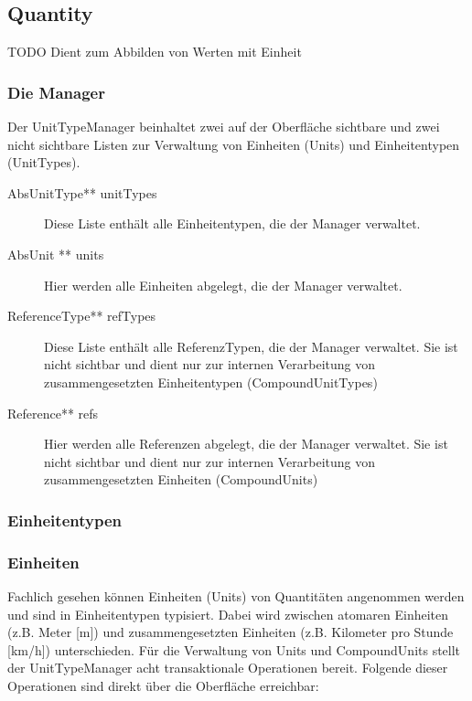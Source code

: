 \subsection{Quantity}
TODO Dient zum Abbilden von Werten mit Einheit

\subsubsection{Die Manager} \newline
{} \newline
Der UnitTypeManager beinhaltet zwei auf der Oberfläche sichtbare und zwei nicht sichtbare Listen zur Verwaltung von Einheiten (Units) und Einheitentypen (UnitTypes).

\begin{description}
\item[AbsUnitType** unitTypes] Diese Liste enthält alle Einheitentypen, die der Manager verwaltet.
\item[AbsUnit ** units] Hier werden alle Einheiten abgelegt, die der Manager verwaltet.
\item[ReferenceType** refTypes] Diese Liste enthält alle ReferenzTypen, die der Manager verwaltet. Sie ist nicht sichtbar und dient nur zur internen Verarbeitung von zusammengesetzten Einheitentypen (CompoundUnitTypes)
\item[Reference** refs] Hier werden alle Referenzen abgelegt, die der Manager verwaltet. Sie ist nicht sichtbar und dient nur zur internen Verarbeitung von zusammengesetzten Einheiten (CompoundUnits)
\end{description}

 \newline

\subsubsection{Einheitentypen} \newline

\subsubsection{Einheiten} \newline
Fachlich gesehen können Einheiten (Units) von Quantitäten angenommen werden und sind in Einheitentypen typisiert.
Dabei wird zwischen atomaren Einheiten (z.B. Meter [m]) und zusammengesetzten Einheiten (z.B. Kilometer pro Stunde [km/h]) unterschieden.
 \newline
Für die Verwaltung von Units und CompoundUnits stellt der UnitTypeManager acht transaktionale Operationen bereit.
Folgende dieser Operationen sind direkt über die Oberfläche erreichbar:

